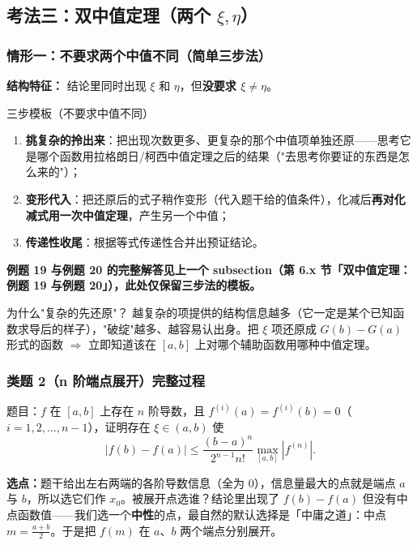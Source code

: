 \documentclass[a4paper]{article}
\begin{document}
\subsection{考法三：双中值定理（两个 $\xi,\eta$）}

\subsubsection{情形一：不要求两个中值不同（简单三步法）}

\textbf{结构特征：} 结论里同时出现 $\xi$ 和 $\eta$，但\textbf{没要求 $\xi\neq\eta$}。

\begin{importantbox}{三步模板（不要求中值不同）}
\begin{enumerate}
\item \textbf{挑复杂的拎出来}：把出现次数更多、更复杂的那个中值项单独还原——思考它是哪个函数用拉格朗日/柯西中值定理之后的结果（"去思考你要证的东西是怎么来的"）；
\item \textbf{变形代入}：把还原后的式子稍作变形（代入题干给的值条件），化减后\textbf{再对化减式用一次中值定理}，产生另一个中值；
\item \textbf{传递性收尾}：根据等式传递性合并出预证结论。
\end{enumerate}
\end{importantbox}

\textbf{例题 19 与例题 20 的完整解答见上一个 subsection（第 6.x 节「双中值定理：例题 19 与例题 20」），此处仅保留三步法的模板。}

\begin{knowledgebox}{为什么"复杂的先还原"？}
越复杂的项提供的结构信息越多（它一定是某个已知函数求导后的样子），"破绽"越多、越容易认出身。把 $\xi$ 项还原成 $G(b)-G(a)$ 形式的函数 $\Rightarrow$ 立即知道该在 $[a,b]$ 上对哪个辅助函数用哪种中值定理。
\end{knowledgebox}


\subsubsection{类题 2（n 阶端点展开）完整过程}

题目：$f$ 在 $[a,b]$ 上存在 $n$ 阶导数，且 $f^{(i)}(a)=f^{(i)}(b)=0$（$i=1,2,\ldots,n-1$），证明存在 $\xi\in(a,b)$ 使
\[
|f(b)-f(a)|\le\frac{(b-a)^{n}}{2^{n-1}n!}\max_{[a,b]}|f^{(n)}|.
\]

\textbf{选点：}题干给出左右两端的各阶导数信息（全为 0），信息量最大的点就是端点 $a$ 与 $b$，所以选它们作 $x_0$。被展开点选谁？结论里出现了 $f(b)-f(a)$ 但没有中点函数值——我们选一个\textbf{中性}的点，最自然的默认选择是「中庸之道」：中点 $m=\frac{a+b}{2}$。于是把 $f(m)$ 在 $a$、$b$ 两个端点分别展开。
\end{document}
